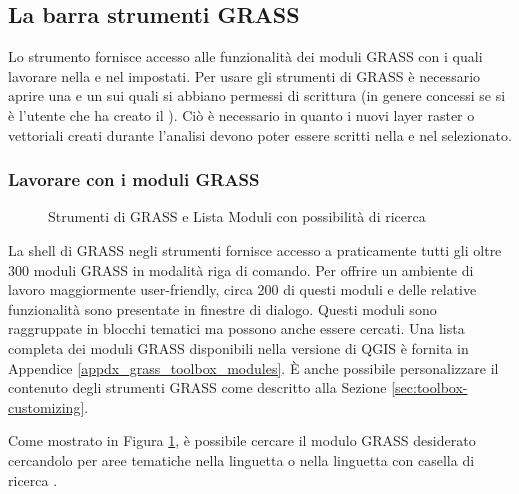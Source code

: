 \subsection{La barra strumenti GRASS}\label{subsec:grass_toolbox}

Lo strumento  fornisce accesso
alle funzionalità dei moduli GRASS con i quali lavorare nella
 e nel  impostati. Per usare gli strumenti
di GRASS è necessario aprire una  e un 
sui quali si abbiano permessi di scrittura (in genere concessi se si è
l'utente che ha creato il ). Ciò è necessario in quanto i
nuovi layer raster o vettoriali creati durante l'analisi devono poter essere
scritti nella  e nel  selezionato.

\subsubsection{Lavorare con i moduli GRASS}

\begin{figure}[h]
\centering
\caption{Strumenti di GRASS e Lista Moduli con possibilità di ricerca \nixcaption}\label{fig:grass_modules}
   \goodgap
\end{figure}

La shell di GRASS negli strumenti fornisce accesso a praticamente tutti gli
oltre 300 moduli GRASS in modalità riga di comando. Per offrire un ambiente di
lavoro maggiormente user-friendly, circa 200 di questi moduli e delle relative
funzionalità sono presentate in finestre di dialogo. Questi moduli sono
raggruppate in blocchi tematici ma possono anche essere cercati. Una lista
completa dei moduli GRASS disponibili nella versione di QGIS \CURRENT
è fornita in Appendice \ref{appdx_grass_toolbox_modules}. È anche possibile
personalizzare il contenuto degli strumenti GRASS come descritto alla Sezione 
\ref{sec:toolbox-customizing}.

Come mostrato in Figura \ref{fig:grass_modules}, è possibile cercare il modulo
GRASS desiderato cercandolo per aree tematiche nella linguetta  o nella linguetta con casella di ricerca . 

